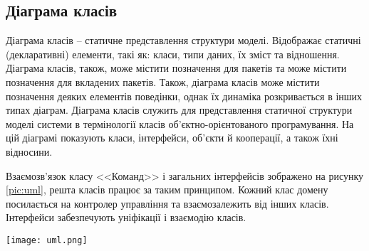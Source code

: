\subsection{Діаграма класів}
\par Діаграма класів -- статичне представлення структури моделі. Відображає статичні (декларативні) елементи, такі як: класи, типи даних, їх зміст та відношення. Діаграма класів, також, може містити позначення для пакетів та може містити позначення для вкладених пакетів. Також, діаграма класів може містити позначення деяких елементів поведінки, однак їх динаміка розкривається в інших типах діаграм. Діаграма класів служить для представлення статичної структури моделі системи в термінології класів об'єктно-орієнтованого програмування. На цій діаграмі показують класи, інтерфейси, об'єкти й кооперації, а також їхні відносини.
\par Взаємозв'язок класу <<Команд>> і загальних інтерфейсів зображено на рисунку \ref{pic:uml}, решта класів працює за таким принципом. Кожний клас домену посилається на контролер управління та взаємозалежить від інших класів. 
Інтерфейси забезпечують уніфікації і взаємодію класів.
\begin{center}
				\texttt{[image: uml.png]}
				\vspace{8pt}
				\label{pic:uml}
		\end{center}





